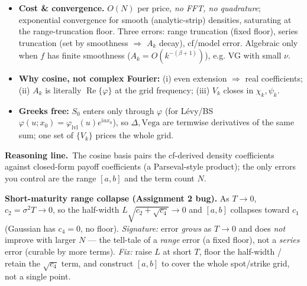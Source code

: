 \documentclass[11pt]{article}
\newcommand{\Real}{\operatorname{Re}}
\newcommand{\ii}{\mathrm{i}}
\newcommand{\ch}{\varphi}
\newcommand{\why}[1]{\smallskip\noindent\textbf{Reasoning line.}\ #1\par}
\begin{document}
\begin{itemize}
  \item \textbf{Cost \& convergence.} $O(N)$ per price, \emph{no FFT, no quadrature}; exponential convergence
  for smooth (analytic-strip) densities, saturating at the range-truncation floor. Three errors: range
  truncation (fixed floor), series truncation (set by smoothness $\Rightarrow$ $A_k$ decay), cf/model error.
  Algebraic only when $f$ has finite smoothness ($A_k=O(k^{-(\beta+1)})$), e.g. VG with small $\nu$.
  \item \textbf{Why cosine, not complex Fourier:} (i) even extension $\Rightarrow$ real coefficients; (ii)
  $A_k$ is literally $\Real\{\ch\}$ at the grid frequency; (iii) $V_k$ closes in $\chi_k,\psi_k$.
  \item \textbf{Greeks free:} $S_0$ enters only through $\ch$ (for L\'evy/BS $\ch(u;x_0)=\ch_{\text{lvl}}(u)
  e^{\ii ux_0}$), so $\Delta,\text{Vega}$ are termwise derivatives of the same sum; one set of $\{V_k\}$ prices
  the whole grid.
\end{itemize}
\why{The cosine basis pairs the cf-derived density coefficients against closed-form payoff coefficients
(a Parseval-style product); the only errors you control are the range $[a,b]$ and the term count $N$.}
\begin{trap}
\textbf{Short-maturity range collapse (Assignment 2 bug).} As $T\to0$, $c_2=\sigma^2T\to0$, so the half-width
$L\sqrt{c_2+\sqrt{c_4}}\to0$ and $[a,b]$ collapses toward $c_1$ (Gaussian has $c_4=0$, no floor). \emph{Signature:}
error \emph{grows} as $T\to0$ and does \emph{not} improve with larger $N$ --- the tell-tale of a \emph{range}
error (a fixed floor), not a \emph{series} error (curable by more terms). \emph{Fix:} raise $L$ at short $T$,
floor the half-width / retain the $\sqrt{c_4}$ term, and construct $[a,b]$ to cover the whole spot/strike grid,
not a single point.
\end{trap}
\end{document}

